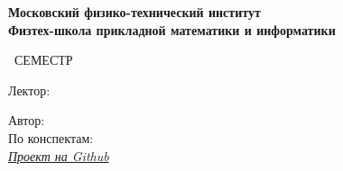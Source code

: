 \begin{titlepage}
	\clearpage\thispagestyle{empty}
	\centering
	
	\textbf{Московский физико-технический институт \\ Физтех-школа прикладной математики и информатики}
	\vspace{33ex}
	
	{\textbf{\FullCourseNameFirstPart}}
	
	\SemesterNumber\ СЕМЕСТР  
	\vspace{1ex}
	
	Лектор: \textit{\LecturerInitials}
	

	\begin{flushright}
		\noindent
		Автор: \href{\VKLink}{\textit{\AuthorInitials}}
		\\
		По конспектам: \href{\VKLink}{\textit{\ConspectInitials}}
		\\
		\href{\GithubLink}{\textit{Проект на Github}}
	\end{flushright}
	
	\vfill
	\CourseDate
	\pagebreak
\end{titlepage}
